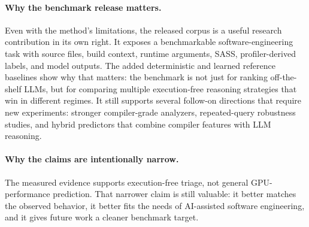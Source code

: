 \paragraph{Why the benchmark release matters.}
Even with the method's limitations, the released corpus is a useful research contribution in its own right.
It exposes a benchmarkable software-engineering task with source files, build context, runtime arguments, SASS, profiler-derived labels, and model outputs.
The added deterministic and learned reference baselines show why that matters:
the benchmark is not just for ranking off-the-shelf LLMs, but for comparing multiple execution-free reasoning strategies that win in different regimes.
It still supports several follow-on directions that require new experiments: stronger compiler-grade analyzers, repeated-query robustness studies, and hybrid predictors that combine compiler features with LLM reasoning.

\paragraph{Why the claims are intentionally narrow.}
The measured evidence supports execution-free triage, not general GPU-performance prediction.
That narrower claim is still valuable: it better matches the observed behavior, it better fits the needs of AI-assisted software engineering, and it gives future work a cleaner benchmark target.
